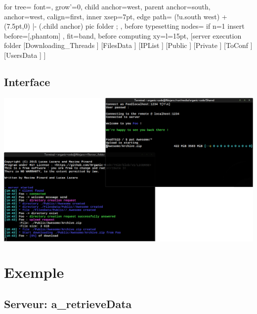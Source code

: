 \documentclass[11pt]{beamer}
\begin{document}
		\begin{frame}
			\begin{forest}
			  for tree={
			    font=\ttfamily,
			    grow'=0,
			    child anchor=west,
			    parent anchor=south,
			    anchor=west,
			    calign=first,
			    inner xsep=7pt,
			    edge path={
			      \noexpand{}
			      (!u.south west) +(7.5pt,0) |- (.child anchor) pic {folder} ;
			    },
			    before typesetting nodes={
			      if n=1
			        {insert before={[,phantom]}}
			        {}
			    },
			    fit=band,
			    before computing xy={l=15pt},
			  }  
			[server execution folder
			  [Downloading\_Threads
			  ]
			  [FilesData
			  ]
			  [IPList
			  ]
			  [Public
			  ]
			  [Private
			  ]
			  [ToConf
			  ]
			  [UsersData
			  ]
			]
			\end{forest}
		\end{frame}

	\subsection*{Interface}

		\begin{frame}
			\includegraphics[width=\linewidth]{interface}
		\end{frame}

\section{Exemple}

	\subsection*{Serveur: a\_retrieveData}
\end{document}
